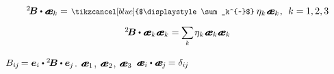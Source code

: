 \nopagebreak\vspace{-0.25em}\begin{equation*}\begin{array}{c}
{^2\!\bm{B}} \dotp \mathboldae_k = \hspace{.2ex} \scalebox{0.82}{$\tikzcancel[blue]{$\displaystyle\sum_k^{~}$}$}\: \eigenvalue_{\hspace{-0.15ex}k} \hspace{.1ex} \mathboldae_k \hspace{.1ex}, \:\: k =\hspace{-0.1ex} 1, 2, 3
\\[.9em]
%
{^2\!\bm{B}} \dotp \tikzmark{BeginEqualsEBrace} {\mathboldae_k \mathboldae_k} \tikzmark{EndEqualsEBrace} = \hspace{-0.1ex} \scalebox{0.9}{$\displaystyle \sum_{\smash{k}}$} \hspace{.2ex} \eigenvalue_{\hspace{-0.15ex}k} \hspace{.1ex} \mathboldae_k \mathboldae_k
\end{array}\end{equation*}

\vspace{-0.25em}
 ${B_{i\hspace{-0.1ex}j} \hspace{-0.2ex} = \bm{e}_i \dotp {^2\!\bm{B}} \dotp \bm{e}_{\hspace{-0.1ex}j}}$.
 ${\mathboldae_1}$, ${\mathboldae_2}$, ${\mathboldae_3}$   ${\mathboldae_i \dotp \mathboldae_{\hspace{-0.1ex}j} \hspace{-0.15ex} = \delta_{i\hspace{-0.1ex}j}}$  

